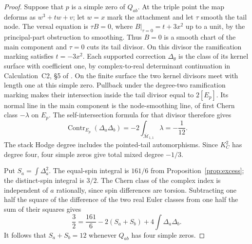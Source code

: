 \begin{proof}
Suppose that \(p\) is a simple zero of \(Q_{ab}\). At the triple point the map deforms as \(w^3+tw+v\); let \(w=x\) mark the attachment and let \(\tau\) smooth the tail node. The versal equation is \(\tau B=0\), where \(B|_{\tau=0}=t+3x^2\) up to a unit, by the principal-part obstruction to smoothing. Thus \(B=0\) is a smooth chart of the main component and \(\tau=0\) cuts its tail divisor. On this divisor the ramification marking satisfies \(t=-3x^2\). Each supported correction \(\Delta_\theta\) is the class of its kernel surface with coefficient one, by complex-to-real determinant continuation in Calculation~C2, \S5 of \cite{WueSupplement}. On the finite surface the two kernel divisors meet with length one at this simple zero. Pullback under the degree-two ramification marking makes their intersection inside the tail divisor equal to \(2[E_p]\). Its normal line in the main component is the node-smoothing line, of first Chern class \(-\lambda\) on \(E_p\). The self-intersection formula for that divisor therefore gives
\[
 \operatorname{Contr}_{E_p}(\Delta_a\Delta_b)
     =-2\int_{\overline{\mathcal M}_{1,1}}\lambda=-\frac1{12}.
\]
The stack Hodge degree includes the pointed-tail automorphisms. Since \(K_C^2\) has degree four, four simple zeros give total mixed degree \(-1/3\).

Put \(S_a=\int\Delta_a^2\). The equal-spin integral is \(161/6\) from Proposition~\ref{prop:excess}; the distinct-spin integral is \(3/2\). The Chern class of the complex index is independent of \(a\) rationally, since spin differences are torsion. Subtracting one half the square of the difference of the two real Euler classes from one half the sum of their squares gives
\[
    \frac32=\frac{161}{6}-2(S_a+S_b)+4\int\Delta_a\Delta_b .
\]
It follows that \(S_a+S_b=12\) whenever \(Q_{ab}\) has four simple zeros.


\end{proof}
